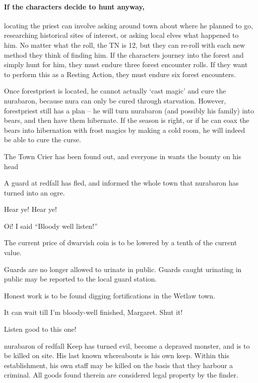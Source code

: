 \begin{multicols}{2}
\paragraph{If the characters decide to hunt anyway,}
locating the priest can involve asking around \gls{town} about where he planned to go, researching historical sites of interest, or asking local elves what happened to him.
No matter what the roll, the TN is 12, but they can re-roll with each new method they think of finding him.
If the characters journey into the forest and simply hunt for him, they must endure three forest encounter rolls.
If they want to perform this as a Resting Action, they must endure six forest encounters.

Once \gls{forestpriest} is located, he cannot actually `cast magic' and cure the \gls{nurabaron}, because nura can only be cured through starvation.
However, \gls{forestpriest} still has a plan -- he will turn \gls{nurabaron} (and possibly his family) into bears, and then have them hibernate.
If the season is right, or if he can coax the bears into hibernation with frost magics by making a cold room, he will indeed be able to cure the curse.


{\N \N The Town Crier}%
{ has been found out, and everyone in  wants the bounty on his head}%

A guard at \gls{redfall} has fled, and informed the whole town that \gls{nurabaron} has turned into an ogre.

\begin{speechtext}

		Hear ye! Hear ye!

		Oi! I said ``Bloody well listen!''

		The current price of dwarvish coin is to be lowered by a tenth of the current value.

		Guards are no longer allowed to urinate in public.
		Guards caught urinating in public may be reported to the local guard station.

		Honest work is to be found digging fortifications in the Wetlaw town.

		It can wait till I'm bloody-well finished, Margaret.  Shut it!

		Listen good to this one!

		\gls{nurabaron} of \gls{redfall} Keep has turned evil, become a depraved monster, and is to be killed on site.  His last known whereabouts is his own keep.  Within this establishment, his own staff may be killed on the basis that they harbour a criminal.  All goods found therein are considered legal property by the finder.


\end{speechtext}
\end{multicols}
